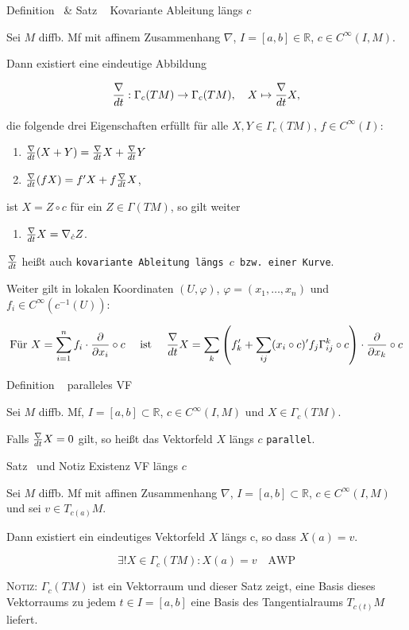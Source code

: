 \documentclass[a6paper,11pt,grid=front]{kartei}
\newcommand{\fl}[1]{\begin{flushleft}
 #1 \end{flushleft}}
\newcommand{\R}{\mathbb{R}}
\newcommand{\pd}[1][x_i]{\frac{\partial}{\partial {#1}}}
\newcounter{def}
\newcounter{satz}
\newcommand{\defreset}{\setcounter{def}{1}}
\newcommand{\satzreset}{\setcounter{satz}{1}}
\newcommand{\thisdef}{\thedef\ \stepcounter{def}}
\newcommand{\thissatz}{\thesatz\ \stepcounter{satz}}
\begin{document}
\nonameyet
{\scriptsize Definition \thisdef \& Satz \thissatz} 
{\scriptsize Kovariante Ableitung längs $c$}
{
	\scriptsize
	\vspace{-2em}
Sei $M$ diffb. Mf mit affinem Zusammenhang $\nabla$, $I =[a,b] \in \R$, 
$c\in C^\infty(I,M)$.
\fl{Dann existiert eine eindeutige Abbildung}
\[
\frac{\nabla}{dt}: \Gamma_c(TM) \to \Gamma_c(TM), \quad X \mapsto \frac{\nabla}{dt} X,
\]
\fl{die folgende drei Eigenschaften erfüllt für alle $X,Y \in \Gamma_c(TM)$,
$f\in C^\infty(I)$:}
\begin{enumerate}[1.]
\item $\frac{\nabla}{dt}(X+Y) = \frac{\nabla}{dt} X + \frac{\nabla}{dt} Y$
\item $\frac{\nabla}{dt}(fX) = f' X + f \frac{\nabla}{dt} X$,
\end{enumerate}
\fl{ist $X = Z \circ c$ für ein $Z \in \Gamma(TM)$, so gilt weiter}
\begin{enumerate}[3.]
\item $\frac{\nabla}{dt} X = \nabla_{\dot c} Z$.
\end{enumerate}
\fl{$\frac{\nabla}{dt}$ heißt auch \texttt{kovariante Ableitung längs $c$ bzw. einer
Kurve}.}
\fl{Weiter gilt in lokalen Koordinaten $(U,\varphi)$, 
\vspace{-1em}
$\varphi = (x_1,\dots,x_n)$ und $f_i \in C^\infty(c^{-1} (U))$:}
\[
\text{Für } X = \sum_{i=1}^n f_i \cdot \pd[x_i] \circ c 
\quad \text{ ist } \quad 
\nabladt X = \sum_k \left ( f_k' + \sum_{ij} (x_i \circ c)' f_j 
\Gamma^k_{ij} \circ c \right) \cdot \pd[x_k] \circ c
\]
}
{}
\defreset
\satzreset
{}

\nonameyet
{Definition \thisdef} {paralleles VF}
{
Sei $M$ diffb. Mf, $I = [a,b] \subset \R$, $c\in C^\infty(I,M)$ und 
$X \in \Gamma_c(TM)$.
\fl{Falls $\frac{\nabla}{dt} X = 0 $ gilt, so heißt das Vektorfeld $X$ längs $c$ 
\texttt{parallel}.}
}
{}

\nonameyet
{Satz \thissatz und Notiz} {Existenz VF längs $c$}
{
Sei $M$ diffb. Mf mit affinen Zusammenhang $\nabla$, 
$I = [a,b] \subset \R$, $c\in C^\infty(I,M)$ und sei $v \in T_{c(a)}M$.
\fl{Dann existiert ein eindeutiges Vektorfeld $X$ längs c,
so dass $X(a) = v$.}
\[
 \exists ! X \in \Gamma_c(TM): X(a) = v
 \quad \text{AWP}
\]
\fl{\textsc{Notiz:} $\Gamma_c(TM)$ ist ein Vektorraum und dieser Satz zeigt,
eine Basis dieses Vektorraums zu jedem $t\in I = [a,b]$ eine Basis
des Tangentialraums $T_{c(t)}M$ liefert.}
}
{}
\end{document}
